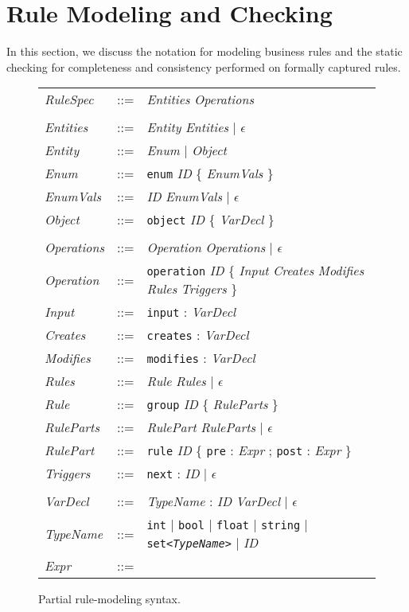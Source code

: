 
\newcommand{\term}{\textit}
\newcommand{\lit}{\texttt}

\section{Rule Modeling and Checking}
\label{sec:model}

In this section, we discuss the notation for modeling business rules and the
static checking for completeness and consistency performed on formally captured
rules.

\begin{figure}[t]
\centering
{\small
\tabcolsep=3pt
\begin{tabular}{lll}
\term{RuleSpec} & ::= & \term{Entities} \term{Operations} \\
\\
\term{Entities} & ::= & \term{Entity} \term{Entities} | $\epsilon$ \\
\term{Entity} & ::= & \term{Enum} | \term{Object} \\
\term{Enum} & ::= & \lit{enum} \term{ID} \{ \term{EnumVals} \} \\
\term{EnumVals} & ::= & \term{ID} \term{EnumVals} | $\epsilon$ \\
\term{Object} & ::= & \lit{object} \term{ID} \{ \term{VarDecl} \} \\
\\
\term{Operations} & ::= & \term{Operation} \term{Operations} | $\epsilon$ \\
\term{Operation} & ::= & \lit{operation} \term{ID} \{ \term{Input}
\term{Creates} \term{Modifies} \term{Rules} \term{Triggers} \} \\
\term{Input} & ::= & \lit{input} : \term{VarDecl} \\
\term{Creates} & ::= & \lit{creates} : \term{VarDecl} \\
\term{Modifies} & ::= & \lit{modifies} : \term{VarDecl} \\
\term{Rules} & ::= & \term{Rule} \term{Rules} | $\epsilon$ \\
\term{Rule} & ::= & \lit{group} \term{ID} \{ \term{RuleParts} \} \\
\term{RuleParts} & ::= & \term{RulePart} \term{RuleParts} | $\epsilon$ \\
\term{RulePart} & ::= & \lit{rule} \term{ID} \{ \lit{pre} : \term{Expr} ;
\lit{post} : \term{Expr} \} \\
\term{Triggers} & ::= & \lit{next} : \term{ID} | $\epsilon$ \\
\\
\term{VarDecl} & ::= & \term{TypeName} : \term{ID} \term{VarDecl} | $\epsilon$
\\
\term{TypeName} & ::= & \lit{int} | \lit{bool} | \lit{float} | \lit{string} |
\lit{set<\term{\textrm{TypeName}}>} | \term{ID} \\
\term{Expr} & ::= & \\
\end{tabular}
}
\caption{Partial rule-modeling syntax.}
\label{fig:model-syntax}
\end{figure}

